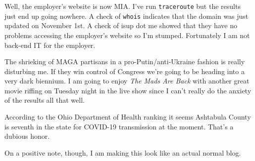 Well, the employer's website is now MIA. I've run \texttt{traceroute}
but the results just end up going nowhere. A check of \texttt{whois}
indicates that the domain was just updated on November 1st. A check of
isup dot me showed that they have no problems accessing the employer's
website so I'm stumped. Fortunately I am not back-end IT for the
employer.

The shrieking of MAGA partisans in a pro-Putin/anti-Ukraine fashion is
really disturbing me. If they win control of Congress we're going to be
heading into a very dark biennium. I am going to enjoy \emph{The Mads
Are Back} with another great movie riffing on Tuesday night in the live
show since I can't really do the anxiety of the results all that well.

According to the Ohio Department of Health ranking it seems Ashtabula
County is seventh in the state for COVID-19 transmission at the moment.
That's a dubious honor.

On a positive note, though, I am making this look like an actual normal
blog.
